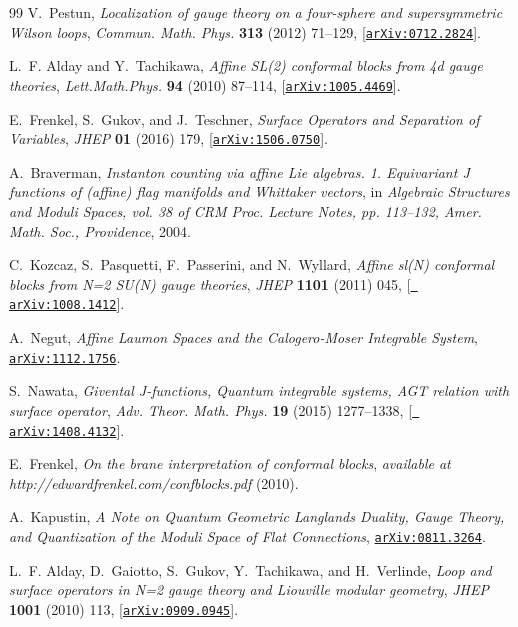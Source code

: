 \begin{thebibliography}{99}
V.~Pestun, {\it {Localization of gauge theory on a four-sphere and
  supersymmetric Wilson loops}},  {\em Commun. Math. Phys.} {\bf 313} (2012)
  71--129, [\href{http://xxx.lanl.gov/abs/0712.2824}{{\tt arXiv:0712.2824}}].

L.~F. Alday and Y.~Tachikawa, {\it {Affine SL(2) conformal blocks from 4d gauge
  theories}},  {\em Lett.Math.Phys.} {\bf 94} (2010) 87--114,
  [\href{http://xxx.lanl.gov/abs/1005.4469}{{\tt arXiv:1005.4469}}].

E.~Frenkel, S.~Gukov, and J.~Teschner, {\it {Surface Operators and Separation
  of Variables}},  {\em JHEP} {\bf 01} (2016) 179,
  [\href{http://xxx.lanl.gov/abs/1506.0750}{{\tt arXiv:1506.0750}}].

A.~Braverman, {\it {Instanton counting via affine Lie algebras. 1. Equivariant
  J functions of (affine) flag manifolds and Whittaker vectors}},  in {\em
  {Algebraic Structures and Moduli Spaces, vol. 38 of CRM Proc. Lecture Notes,
  pp. 113--132, Amer. Math. Soc., Providence}}, 2004.

C.~Kozcaz, S.~Pasquetti, F.~Passerini, and N.~Wyllard, {\it {Affine sl(N)
  conformal blocks from N=2 SU(N) gauge theories}},  {\em JHEP} {\bf 1101}
  (2011) 045, [\href{http://xxx.lanl.gov/abs/1008.1412}{{\tt
  arXiv:1008.1412}}].

A.~Negut, {\it {Affine Laumon Spaces and the Calogero-Moser Integrable
  System}},  \href{http://xxx.lanl.gov/abs/1112.1756}{{\tt arXiv:1112.1756}}.

S.~Nawata, {\it {Givental J-functions, Quantum integrable systems, AGT relation
  with surface operator}},  {\em Adv. Theor. Math. Phys.} {\bf 19} (2015)
  1277--1338, [\href{http://xxx.lanl.gov/abs/1408.4132}{{\tt
  arXiv:1408.4132}}].

E.~Frenkel, {\it On the brane interpretation of conformal blocks},  {\em {\rm
  available at http://edwardfrenkel.com/confblocks.pdf}} (2010).

A.~Kapustin, {\it {A Note on Quantum Geometric Langlands Duality, Gauge Theory,
  and Quantization of the Moduli Space of Flat Connections}},
  \href{http://xxx.lanl.gov/abs/0811.3264}{{\tt arXiv:0811.3264}}.

L.~F. Alday, D.~Gaiotto, S.~Gukov, Y.~Tachikawa, and H.~Verlinde, {\it {Loop
  and surface operators in N=2 gauge theory and Liouville modular geometry}},
  {\em JHEP} {\bf 1001} (2010) 113,
  [\href{http://xxx.lanl.gov/abs/0909.0945}{{\tt arXiv:0909.0945}}].


\end{thebibliography}
